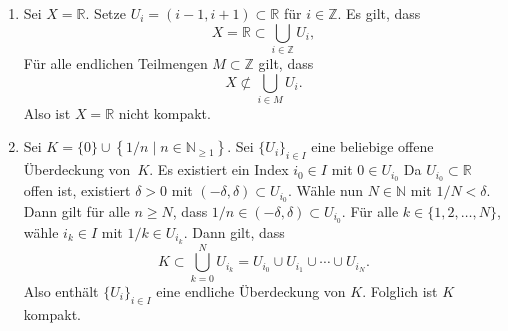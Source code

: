 \documentclass[../main.tex]{subfiles}
\begin{document}
\begin{examples}
  \leavevmode
  \begin{enumerate}[(1)]
    \item Sei $X = \mathbb{R}$.
      Setze
      $U_i = (i - 1, i + 1) \subset \mathbb{R}$
      für $i \in \mathbb{Z}$.
      Es gilt, dass
      \[
        X = \mathbb{R} \subset \bigcup_{i \in \mathbb{Z}} U_i,
      \]
      Für alle endlichen Teilmengen
      $M \subset \mathbb{Z}$ gilt, dass
      \[
      X \not\subset \bigcup_{i \in M} U_i.
      \]
      Also ist $X = \mathbb{R}$ nicht kompakt.
    \item Sei $K = \{0\} \cup \left\{1/n \mid 
      n \in \mathbb{N}_{\geq 1}\right\}$.
      Sei ${\{U_i\}}_{i \in I}$ eine
      beliebige offene Überdeckung von~$K$.
      Es existiert ein Index $i_0 \in I$ 
      mit $0 \in U_{i_{0}}$ 
      Da $U_{i_0} \subset \mathbb{R}$ offen ist,
      existiert $\delta > 0$ mit
      $(-\delta, \delta) \subset U_{i_0}$.
      Wähle nun $N \in \mathbb{N}$ 
      mit $1/N < \delta$.
      Dann gilt für alle $n \geq N$,
      dass $1/n \in (-\delta, \delta) \subset U_{i_0}$.
      Für alle $k \in \{1, 2, \dots, N\}$, wähle
      $i_k \in I$ mit $1/k \in U_{i_k}$.
      Dann gilt, dass
      \[
        K \subset \bigcup_{k=0}^{N} U_{i_k}
        = U_{i_0} \cup U_{i_1} \cup \cdots
        \cup U_{i_N}.
      \]
      Also enthält ${\{U_i\}}_{i \in I}$ 
      eine endliche Überdeckung von $K$.
      Folglich ist $K$ kompakt.
  \end{enumerate}
\end{examples}
\end{document}
